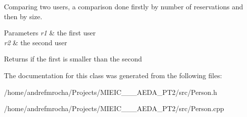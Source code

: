 Comparing two users, a comparison done firstly by number of reservations and then by size. 


\begin{DoxyParams}{Parameters}
{\em r1} & the first user \\
\hline
{\em r2} & the second user \\
\hline
\end{DoxyParams}
\begin{DoxyReturn}{Returns}
if the first is smaller than the second 
\end{DoxyReturn}


The documentation for this class was generated from the following files\+:\begin{DoxyCompactItemize}
\item 
/home/andrefmrocha/\+Projects/\+M\+I\+E\+I\+C\+\_\+\_\+\_\+\+A\+E\+D\+A\+\_\+\+P\+T2/src/Person.\+h\item 
/home/andrefmrocha/\+Projects/\+M\+I\+E\+I\+C\+\_\+\_\+\_\+\+A\+E\+D\+A\+\_\+\+P\+T2/src/Person.\+cpp\end{DoxyCompactItemize}
